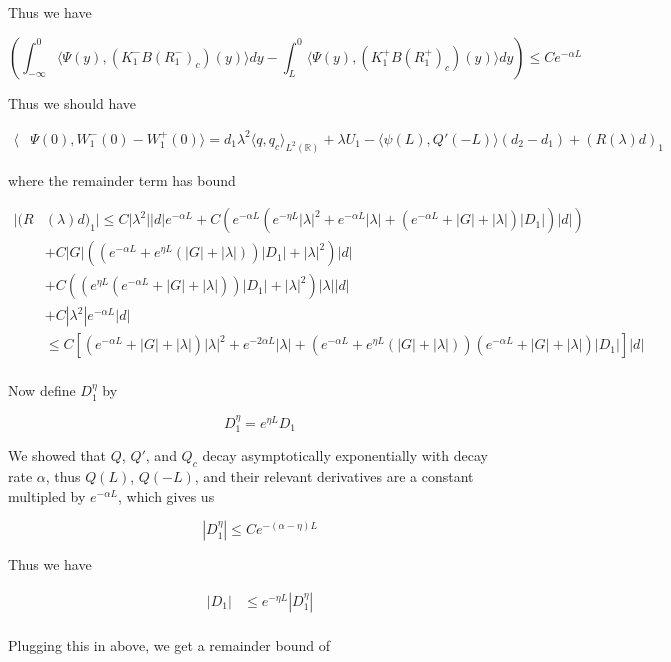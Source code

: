 \documentclass[12pt]{article}
\def\R{{\mathbb R}}
\begin{document}
\begin{enumerate}
Thus we have

\[
\left( \int_{-\infty}^0 \langle \Psi(y), (K_1^- B (R_1^-)_c)(y) \rangle dy - \int_{L}^0 \langle \Psi(y), (K_1^+ B (R_1^+)_c)(y) \rangle dy \right) \leq C e^{-\alpha L}
\]

\end{enumerate}

Thus we should have

\begin{align*}
\langle &\Psi(0), W_1^-(0) - W_1^+(0) \rangle = d_1 \lambda^2 \langle q, q_c \rangle_{L^2(\R)} + \lambda U_1 - \langle \psi(L), Q'(-L) \rangle(d_2 - d_1) + (R(\lambda)d)_1
\end{align*}

where the remainder term has bound

\begin{align*}
|(R&(\lambda)d)_1| \leq C |\lambda^2| |d| e^{-\alpha L} + C \left( e^{-\alpha L} (e^{-\eta L}|\lambda|^2 + e^{-\alpha L}|\lambda| + (e^{-\alpha L} + |G| + |\lambda|)|D_1|)|d| \right) \\
&+ C|G| \left( \left( e^{-\alpha L} + e^{\eta L}(|G| + |\lambda|)  \right) |D_1| + |\lambda|^2 \right)|d| \\
&+ C \left(\left( e^{\eta L}(e^{-\alpha L} + |G| + |\lambda|) \right)|D_1| + |\lambda|^2 \right)|\lambda| |d| \\
&+ C |\lambda^2| e^{-\alpha L} |d| \\
&\leq C \left[ (e^{-\alpha L} + |G| + |\lambda|) |\lambda|^2 + e^{-2\alpha L}|\lambda| + (e^{-\alpha L} + e^{\eta L}(|G| + |\lambda|))(e^{-\alpha L} + |G| + |\lambda|) |D_1| \right] |d| \\
\end{align*}

Now define $D_1^{\eta}$ by

\[
D_1^{\eta} = e^{\eta L} D_1
\]

We showed that $Q$, $Q'$, and $Q_c$ decay asymptotically exponentially with decay rate $\alpha$, thus $Q(L)$, $Q(-L)$, and their relevant derivatives are a constant multipled by $e^{-\alpha L}$, which gives us

\[
|D_1^{\eta}| \leq C e^{-(\alpha - \eta)L}
\]

Thus we have

\begin{align*}
|D_1| &\leq e^{-\eta L} |D_1^{\eta}| \\
\end{align*}

Plugging this in above, we get a remainder bound of
\end{document}
